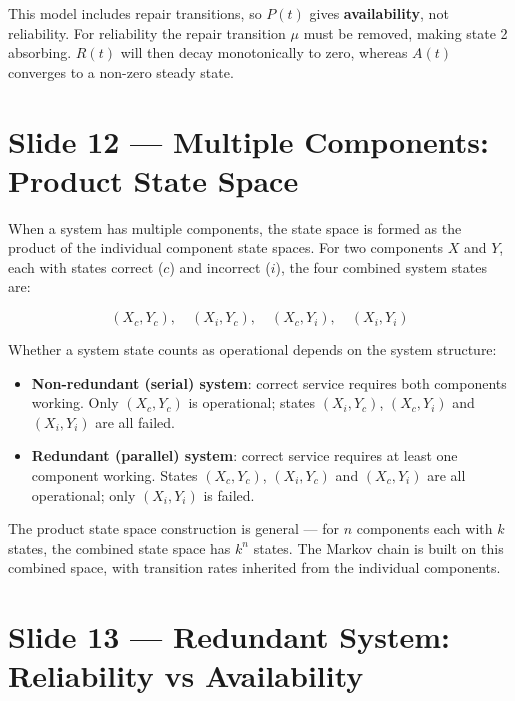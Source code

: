 \begin{warnbox}
    This model includes repair transitions, so $P(t)$ gives 
    \textbf{availability}, not reliability. For reliability the 
    repair transition $\mu$ must be removed, making state 2 absorbing. 
    $R(t)$ will then decay monotonically to zero, whereas $A(t)$ 
    converges to a non-zero steady state.
\end{warnbox}

\section*{Slide 12 — Multiple Components: Product State Space}

When a system has multiple components, the state space is formed as 
the product of the individual component state spaces. For two 
components $X$ and $Y$, each with states correct ($c$) and incorrect 
($i$), the four combined system states are:

\[
    (X_c, Y_c), \quad (X_i, Y_c), \quad (X_c, Y_i), \quad (X_i, Y_i)
\]

Whether a system state counts as operational depends on the system 
structure:

\begin{itemize}
    \item \textbf{Non-redundant (serial) system}: correct service 
    requires both components working. Only $(X_c, Y_c)$ is operational; 
    states $(X_i, Y_c)$, $(X_c, Y_i)$ and $(X_i, Y_i)$ are all failed.

    \item \textbf{Redundant (parallel) system}: correct service requires 
    at least one component working. States $(X_c, Y_c)$, $(X_i, Y_c)$ 
    and $(X_c, Y_i)$ are all operational; only $(X_i, Y_i)$ is failed.
\end{itemize}

\begin{notebox}
    The product state space construction is general --- for $n$ 
    components each with $k$ states, the combined state space has 
    $k^n$ states. The Markov chain is built on this combined space, 
    with transition rates inherited from the individual components.
\end{notebox}

\section*{Slide 13 — Redundant System: Reliability vs Availability}


